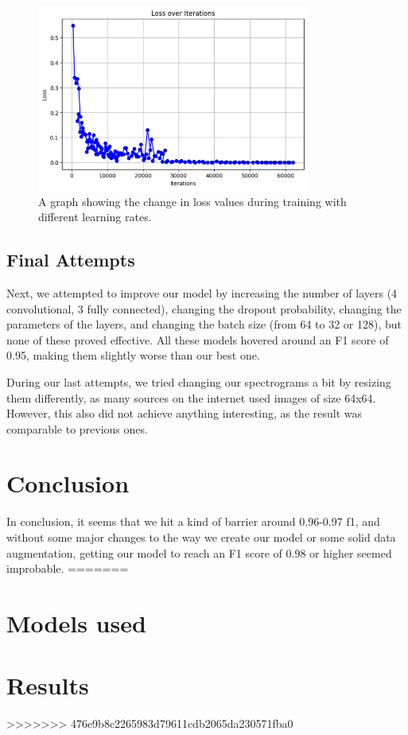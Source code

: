 \documentclass[11pt, letterpaper]{article}
\begin{document}
\begin{figure}[H]
    \centering
    \includegraphics[width=0.8\textwidth]{lossplot2.png}
    \caption{A graph showing the change in loss values during training with different learning rates.}
\end{figure}

\subsection{Final Attempts}

Next, we attempted to improve our model by increasing the number of layers (4 convolutional, 3 fully connected), changing the dropout probability, changing the parameters of the layers, and changing the batch size (from 64 to 32 or 128), but none of these proved effective. All these models hovered around an F1 score of 0.95, making them slightly worse than our best one.

During our last attempts, we tried changing our spectrograms a bit by resizing them differently, as many sources on the internet used images of size 64x64. However, this also did not achieve anything interesting, as the result was comparable to previous ones.

\section{Conclusion}

In conclusion, it seems that we hit a kind of barrier around 0.96-0.97 f1, and without some major changes to the way we create our model or some solid data augmentation, getting our model to reach an F1 score of 0.98 or higher seemed improbable.
=======
\section{Models used}
\section{Results}
>>>>>>> 476e9b8c2265983d79611cdb2065da230571fba0
\end{document}
